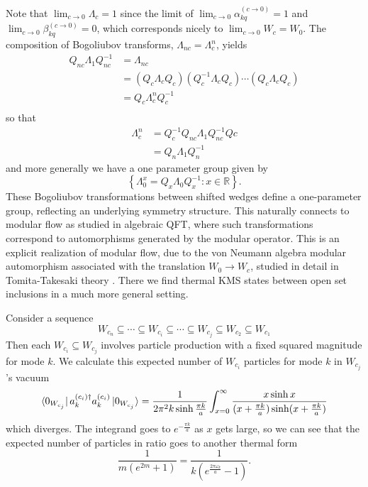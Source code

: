 \documentclass[12pt,a4paper]{article}
\begin{document}
Note that $\lim_{c\to 0} \Lambda_c = 1$ since the limit of $\lim_{c\to 0} \alpha_{kq}^{(c \rightarrow 0)} = 1$ and $\lim_{c\to 0} \beta_{kq}^{(c \rightarrow 0)} = 0$, which corresponds nicely to $\lim_{c\to 0} W_c = W_0$. The composition of Bogoliubov transforms, $\Lambda_{nc} = \Lambda_c^n$, yields
\begin{equation}
  \begin{array}{ll}    
    Q_{nc} \Lambda_1 Q_{nc}^{-1}  &= \Lambda_{nc} \\
         &= \left(Q_c \Lambda_{c} Q_c\right) \left( Q_c^{-1} \Lambda_{c} Q_c\right) \cdots \left(Q_c \Lambda_{c} Q_c\right) \\
  &= Q_c \Lambda_c^n Q_c^{-1} \\
  \end{array}
\end{equation}
so that
\begin{equation}
  \begin{array}{ll}
  \Lambda_c^n &= Q_c^{-1} Q_{nc} \Lambda_1 Q_{nc}^{-1} Q{c} \\
  &= Q_n \Lambda_1 Q_n^{-1}
  \end{array}
\end{equation}
and more generally we have a one parameter group given by
\begin{equation}
  \left\{\Lambda_0^x = Q_x \Lambda_0 Q_x^{-1} : x \in \mathbb{R} \right\}.
\end{equation}
These Bogoliubov transformations between shifted wedges define a one-parameter group, reflecting an underlying symmetry structure. This naturally connects to modular flow as studied in algebraic QFT, where such transformations correspond to automorphisms generated by the modular operator. This is an explicit realization of modular flow, due to the von Neumann algebra modular automorphism associated with the translation $W_0 \rightarrow W_c$, studied in detail in Tomita-Takesaki theory \cite{Borchers2000}.  There we find thermal KMS states between open set inclusions in a much more general setting.


Consider a sequence
\begin{equation}
  W_{c_n} \subseteq \cdots \subseteq W_{c_i} \subseteq \cdots \subseteq W_{c_j} \subseteq W_{c_2} \subseteq W_{c_1}
\end{equation}
Then each $W_{c_i} \subseteq W_{c_j}$ involves particle production with a fixed squared magnitude for mode $k$.  We calculate this expected number of $W_{c_i}$ particles for mode $k$ in $W_{c_j}$'s vacuum
\begin{equation}
  \bra{0_{W_{c_j}}} a^{(c_i)\dagger}_k a^{(c_i)}_k \ket{0_{W_{c_j}}} = \frac{1}{2 \pi^2 k \sinh \frac{\pi k}{a}} \int_{x=0}^\infty \frac{x \sinh x}{(x+\frac{\pi k}{a}) \sinh(x+\frac{\pi k}{a})}
\end{equation}
which diverges.  The integrand goes to $e^{-\frac{\pi k}{a}}$ as $x$ gets large, so we can see that the expected number of particles in ratio goes to another thermal form
\begin{equation}
  \frac{1}{m (e^{2m} + 1)} = \frac{1}{k (e^{\frac{2\pi \omega_k}{a}} - 1)}.
\end{equation}
\end{document}

